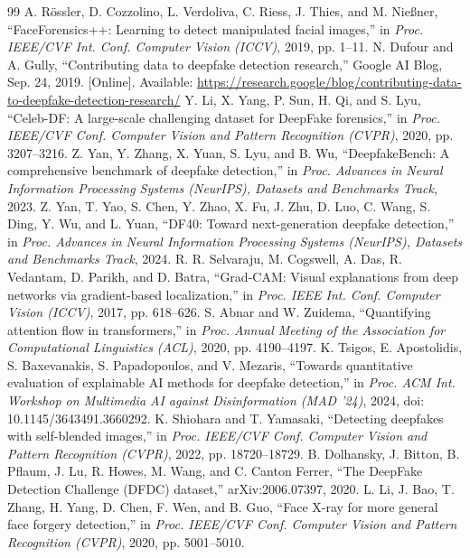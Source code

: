 \begin{thebibliography}{99}
\footnotesize
{} A. Rössler, D. Cozzolino, L. Verdoliva, C. Riess, J. Thies, and M. Nießner, ``FaceForensics++: Learning to detect manipulated facial images,'' in \emph{Proc. IEEE/CVF Int. Conf. Computer Vision (ICCV)}, 2019, pp. 1--11.
 N. Dufour and A. Gully, ``Contributing data to deepfake detection research,'' Google AI Blog, Sep. 24, 2019. [Online]. Available: \url{https://research.google/blog/contributing-data-to-deepfake-detection-research/}
 Y. Li, X. Yang, P. Sun, H. Qi, and S. Lyu, ``Celeb-DF: A large-scale challenging dataset for DeepFake forensics,'' in \emph{Proc. IEEE/CVF Conf. Computer Vision and Pattern Recognition (CVPR)}, 2020, pp. 3207--3216.
 Z. Yan, Y. Zhang, X. Yuan, S. Lyu, and B. Wu, ``DeepfakeBench: A comprehensive benchmark of deepfake detection,'' in \emph{Proc. Advances in Neural Information Processing Systems (NeurIPS), Datasets and Benchmarks Track}, 2023.
 Z. Yan, T. Yao, S. Chen, Y. Zhao, X. Fu, J. Zhu, D. Luo, C. Wang, S. Ding, Y. Wu, and L. Yuan, ``DF40: Toward next-generation deepfake detection,'' in \emph{Proc. Advances in Neural Information Processing Systems (NeurIPS), Datasets and Benchmarks Track}, 2024.
 R. R. Selvaraju, M. Cogswell, A. Das, R. Vedantam, D. Parikh, and D. Batra, ``Grad-CAM: Visual explanations from deep networks via gradient-based localization,'' in \emph{Proc. IEEE Int. Conf. Computer Vision (ICCV)}, 2017, pp. 618--626.
 S. Abnar and W. Zuidema, ``Quantifying attention flow in transformers,'' in \emph{Proc. Annual Meeting of the Association for Computational Linguistics (ACL)}, 2020, pp. 4190--4197.
 K. Tsigos, E. Apostolidis, S. Baxevanakis, S. Papadopoulos, and V. Mezaris, ``Towards quantitative evaluation of explainable AI methods for deepfake detection,'' in \emph{Proc. ACM Int. Workshop on Multimedia AI against Disinformation (MAD '24)}, 2024, doi: 10.1145/3643491.3660292.
 K. Shiohara and T. Yamasaki, ``Detecting deepfakes with self-blended images,'' in \emph{Proc. IEEE/CVF Conf. Computer Vision and Pattern Recognition (CVPR)}, 2022, pp. 18720--18729.
 B. Dolhansky, J. Bitton, B. Pflaum, J. Lu, R. Howes, M. Wang, and C. Canton Ferrer, ``The DeepFake Detection Challenge (DFDC) dataset,'' arXiv:2006.07397, 2020.
 L. Li, J. Bao, T. Zhang, H. Yang, D. Chen, F. Wen, and B. Guo, ``Face X-ray for more general face forgery detection,'' in \emph{Proc. IEEE/CVF Conf. Computer Vision and Pattern Recognition (CVPR)}, 2020, pp. 5001--5010.

\end{thebibliography}
